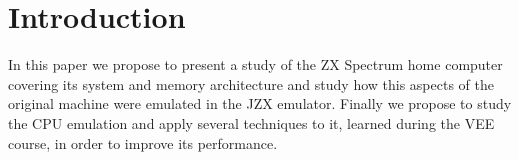 \documentclass[times, 10pt,twocolumn]{scrartcl}
\begin{document}
\section{Introduction}
In this paper we propose to present a study of the ZX Spectrum home computer covering its system and memory architecture and study how this aspects of the original machine were emulated in the JZX emulator. Finally we propose to study the CPU emulation and apply several techniques to it, learned during the VEE course, in order to improve its performance.



\end{document}
